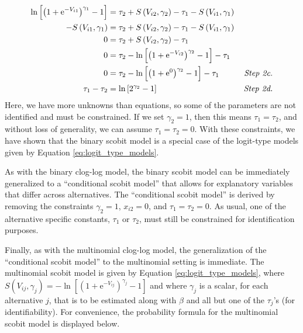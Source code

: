 \begin{equation}
\label{eq:scobit_to_logit_part2}
\begin{aligned}
\ln \left[ \left( 1 + \mathrm{e}^{- V_{i1}} \right)^ {\gamma _1} - 1 \right] &= \tau_2 + S \left( V_{i2}, \gamma_2 \right) - \tau_1 - S \left( V_{i1}, \gamma_1 \right)\\
- S \left( V_{i1}, \gamma_1 \right) &= \tau_2 + S \left( V_{i2}, \gamma_2 \right) - \tau_1 - S \left( V_{i1}, \gamma_1 \right) \\
0 &= \tau_2 + S \left( V_{i2}, \gamma_2 \right) - \tau_1 \\
0 &= \tau_2 - \ln \left[ \left( 1 + \mathrm{e}^{- V_{i2}} \right)^ {\gamma _2} - 1 \right] - \tau_1 \\
0 &= \tau_2 - \ln \left[ \left( 1 + \mathrm{e}^{0} \right)^ {\gamma _2} - 1 \right] - \tau_1  \qquad &\textrm{\textit{Step 2c.}}\\
\tau_1 - \tau_2 &= \ln \left[ 2^{\gamma _2} - 1 \right] \qquad &\textrm{\textit{Step 2d.}}
\end{aligned}
\end{equation}
Here, we have more unknowns than equations, so some of the parameters are not identified and must be constrained. If we set $\gamma _2 = 1$, then this means $\tau_1 = \tau_2$, and without loss of generality, we can assume $\tau_1 = \tau_2 = 0$. With these constraints, we have shown that the binary scobit model is a special case of the logit-type models given by Equation \ref{eq:logit_type_models}.

As with the binary clog-log model, the binary scobit model can be immediately generalized to a ``conditional scobit model'' that allows for explanatory variables that differ across alternatives. The ``conditional scobit model'' is derived by removing the constraints $\gamma _2 = 1$, $x_{i2} = 0$, and $\tau_1 = \tau_2 = 0$. As usual, one of the alternative specific constants, $\tau_1$ or $\tau_2$, must still be constrained for identification purposes.

Finally, as with the multinomial clog-log model, the generalization of the ``conditional scobit model'' to the multinomial setting is immediate. The multinomial scobit model is given by Equation \ref{eq:logit_type_models}, where $S \left( V_{ij}, \gamma_j \right) = - \ln \left[ \left( 1 + \mathrm{e}^{- V_{ij}} \right)^ {\gamma _j} - 1 \right]$ and where $\gamma _j$ is a scalar, for each alternative $j$, that is to be estimated along with $\beta$ and all but one of the $\tau _j$'s (for identifiability). For convenience, the probability formula for the multinomial scobit model is displayed below.

